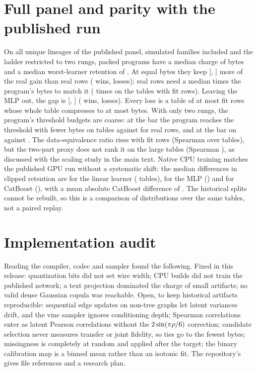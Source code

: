 \documentclass{article}
\begin{document}
\section{Full panel and parity with the published run}
\label{app:panel}
On all \EbPanelLineages{} unique lineages of the published panel, simulated families included and the
ladder restricted to two rungs, packed programs have a median charge of \EbPanelBytes{} bytes and a median
worst-learner retention of \EbPanelRobust{}. At equal bytes they keep \EbPanelGap{} [\EbPanelGapLo,
\EbPanelGapHi] more of the real gain than real rows (\EbPanelWins{} wins, \EbPanelLosses{} losses); real
rows need a median \EbPanelRatio{} times the program's bytes to match it (\EbPanelRatioLarge{} times on the
\EbPanelLarge{} tables with \cFitCap{} fit rows). Leaving the MLP out, the gap is \EbPanelNoMlpGap{} [\EbPanelNoMlpGapLo, \EbPanelNoMlpGapHi]
(\EbPanelNoMlpWins{} wins, \EbPanelNoMlpLosses{} losses). Every loss is a table of at most \EbPanelLossMaxRows{} fit rows whose whole table compresses to at
most \EbPanelLossMaxFull{} bytes. With only two rungs, the program's threshold budgets are coarse: at the
\cTau{} bar the program reaches the threshold with fewer bytes on \EbPanelTdlEightyDope{} tables against
\EbPanelTdlEightyData{} for real rows, and at the \cTauStrict{} bar on \EbPanelTdlNinetyDope{} against
\EbPanelTdlNinetyData{}. The data-equivalence ratio rises with fit rows (Spearman \EbPanelRhoRows{} over
\EbPanelRhoRowsN{} tables), but the two-part proxy does not rank it on the \EbPanelRhoProxyN{} large tables
(Spearman \EbPanelRhoProxy{}), as discussed with the scaling study in the main text. Native CPU training matches the published GPU run without a systematic shift: the median differences in
clipped retention are \EbParityLinear{} for the linear learner (\EbParityLinearN{} tables), \EbParityMlp{}
for the MLP (\EbParityMlpN{}) and \EbParityCatboost{} for CatBoost (\EbParityCatboostN{}), with a mean
absolute CatBoost difference of \EbParityCatboostAbs{}. The historical
splits cannot be rebuilt, so this is a comparison of distributions over the same tables, not a paired replay.

\section{Implementation audit}
\label{app:audit}
Reading the compiler, codec and sampler found the following. Fixed in this release: quantization bits did
not set wire width; CPU builds did not train the published network; a text projection dominated the charge
of small artifacts; no valid dense Gaussian copula was reachable. Open, to keep historical artifacts
reproducible: sequential edge updates on non-tree graphs let latent variances drift, and the vine sampler
ignores conditioning depth; Spearman correlations enter as latent Pearson correlations without the
$2\sin(\pi\rho/6)$ correction; candidate selection never measures transfer or joint fidelity, so ties go
to the fewest bytes; missingness is completely at random and applied after the target; the binary
calibration map is a binned mean rather than an isotonic fit. The repository's  gives
file references and a research plan.
\end{document}
